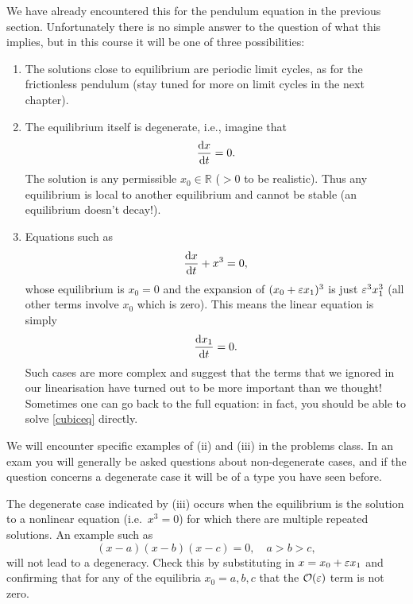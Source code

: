 \documentclass[main.tex]{subfiles}
\begin{document}
We have already encountered this for the pendulum equation in the previous section. Unfortunately there is no simple answer to the question of what this implies, but in this course it will be one of three possibilities:
\begin{enumerate}[label=(\roman*)]
\item{The solutions close to equilibrium are periodic limit cycles, as for the frictionless pendulum (stay tuned for more on limit cycles in the next chapter).}
\item{The equilibrium itself is degenerate, i.e., imagine that
\begin{equation}
\fd{x}{t} =0.
\end{equation}
The solution is any permissible $x_0\in\mathbb{R}$ ($>0$ to be realistic). Thus any equilibrium is local to another equilibrium and cannot be stable (an equilibrium doesn't decay!).
}\item{Equations such as 
\begin{equation}
\label{cubiceq}
\fd{x}{t} + x^3 =0,
\end{equation}
whose  equilibrium is $x_0=0$ and the expansion of $(x_0+\varepsilon x_1)^3$ is just $\varepsilon^3 x_1^3$ (all other terms involve $x_0$ which is zero). This means the linear equation is simply
\begin{equation}
\fd{x_1}{t}=0.
\end{equation}
Such cases are more complex and suggest that the terms that we ignored in our linearisation have turned out to be more important than we thought! Sometimes one can go back to the full equation: in fact, you should be able to solve \cref{cubiceq} directly. 
}
\end{enumerate}
\begin{info}
	We will encounter specific examples of (ii) and (iii) in the problems class. In an exam you will generally be asked questions about non-degenerate cases, and if the question concerns a degenerate case it will be of a type you have seen before.
\end{info}

\begin{do-it-yourself}
The degenerate case indicated by (iii) occurs when the equilibrium is the solution to a nonlinear equation (i.e.\ $x^3=0$) for which there are multiple repeated solutions. An example such as
\begin{equation}
(x-a)(x-b)(x-c)=0,\quad a>b>c,
\end{equation}
will not lead to a degeneracy. Check this by substituting in $x = x_0 + \varepsilon x_1$ and confirming that for any of the equilibria  $x_0 = a, b, c$ that the $\mathcal{O}(\varepsilon)$ term is not zero.
\end{do-it-yourself}
\end{document}
